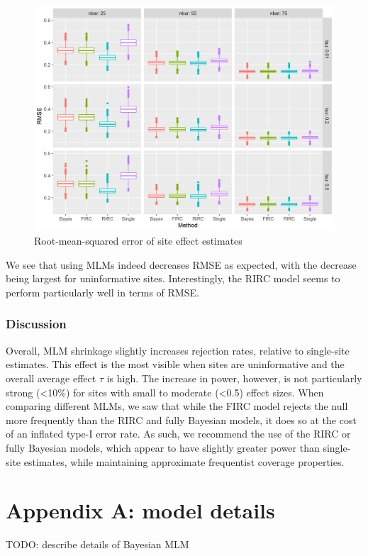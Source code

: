 \documentclass[]{article}
\begin{document}
\begin{figure}[ht]
	\centering
	\includegraphics[width=\textwidth]{rmse_plot}
	\caption{Root-mean-squared error of site effect estimates}
	\label{fig:rmse_plot}
\end{figure}

We see that using MLMs indeed decreases RMSE as expected, with the decrease being largest for uninformative sites.
Interestingly, the RIRC model seems to perform particularly well in terms of RMSE.


\subsubsection{Discussion}
Overall, MLM shrinkage slightly increases rejection rates, relative to single-site estimates.
This effect is the most visible when sites are uninformative and the overall average effect $\tau$ is high.
The increase in power, however, is not particularly strong (<10\%) for sites with small to moderate (<0.5) effect sizes.
When comparing different MLMs, we saw that while the FIRC model rejects the null more frequently than the RIRC and fully Bayesian models, it does so at the cost of an inflated type-I error rate.
As such, we recommend the use of the RIRC or fully Bayesian models, which appear to have slightly greater power than single-site estimates, while maintaining approximate frequentist coverage properties.



\appendix
\section{Appendix A: model details}

TODO: describe details of Bayesian MLM


	
\end{document}
